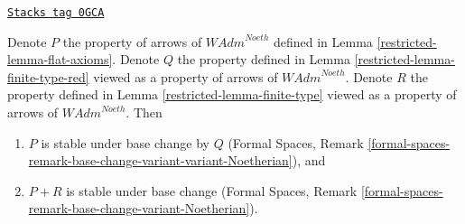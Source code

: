 \begin{lemma}
\label{restricted-lemma-base-change-flat-continuous}
\href{https://stacks.math.columbia.edu/tag/0GCA}{\texttt{Stacks tag 0GCA}}

Denote $P$ the property of arrows of $\textit{WAdm}^{Noeth}$
defined in Lemma \ref{restricted-lemma-flat-axioms}.
Denote $Q$ the property defined in Lemma \ref{restricted-lemma-finite-type-red}
viewed as a property of arrows of $\textit{WAdm}^{Noeth}$.
Denote $R$ the property defined in Lemma \ref{restricted-lemma-finite-type}
viewed as a property of arrows of $\textit{WAdm}^{Noeth}$. Then
\begin{enumerate}
\item $P$ is stable under base change by $Q$
(Formal Spaces, Remark
\ref{formal-spaces-remark-base-change-variant-variant-Noetherian}), and
\item $P + R$ is stable under base change
(Formal Spaces, Remark
\ref{formal-spaces-remark-base-change-variant-Noetherian}).
\end{enumerate}
\end{lemma}

